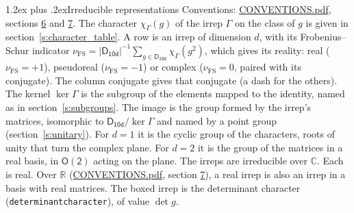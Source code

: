 \documentclass[10pt,a4paper]{article}
\makeatletter
\renewcommand\section{\@startsection{section}{1}{\z@}{-3ex plus -1ex minus -.2ex}%
  {1.2ex plus .2ex}{\normalfont\large\sffamily\bfseries\color{parttitle}}}
\numberwithin{equation}{section}
\newcommand{\grp}[1]{\mathsf{#1}}
\newcommand{\irchar}[1]{\chi_{#1}}
\newcommand{\fsind}{\nu_{\mathrm{FS}}}
\makeatother
\begin{document}
\section{Irreducible representations}\label{s:irreps}
Conventions: \href{../../CONVENTIONS.pdf}{CONVENTIONS.pdf}, sections \href{../../CONVENTIONS.pdf\#conv.6}{6} and \href{../../CONVENTIONS.pdf\#conv.7}{7}.
\leavevmode\label{n:function.character}\label{n:irrep.Gamma}The character $\irchar{\Gamma}(g)$ of the irrep $\Gamma$ on the class of $g$ is given in section~\ref{s:character_table}.
\leavevmode\label{n:index.dimension}\label{n:index.frobenius}\label{n:head.irrep}\label{n:head.reality}A row is an irrep of dimension $d$, with its Frobenius--Schur indicator $\fsind = |\grp{D_{10d}}|^{-1}\allowbreak\sum_{g\in\grp{D_{10d}}}\irchar{\Gamma}(g^2)$, which gives its reality: real ($\fsind = +1$), pseudoreal ($\fsind = -1$) or complex ($\fsind = 0$, paired with its conjugate). \label{n:head.conjugate}The column conjugate gives that conjugate (a dash for the others). \label{n:head.kernel}The kernel $\ker\Gamma$ is the subgroup of the elements mapped to the identity, named as in section~\ref{s:subgroups}. \label{n:head.image}The image is the group formed by the irrep's matrices, isomorphic to $\grp{D_{10d}}/\ker\Gamma$ and named by a point group (section~\ref{s:unitary}). For $d = 1$ it is the cyclic group of the characters, roots of unity that turn the complex plane. For $d = 2$ it is the group of the matrices in a real basis, in $\grp{O(2)}$ acting on the plane. The irreps are irreducible over $\mathbb{C}$. Each is real. Over $\mathbb{R}$ (\href{../../CONVENTIONS.pdf}{CONVENTIONS.pdf}, section \href{../../CONVENTIONS.pdf\#conv.7}{7}), a real irrep is also an irrep in a basis with real matrices. \label{n:mark.determinant}The boxed irrep is the determinant character (\texttt{determinantcharacter}), of value $\det g$.
\setlength{\emergencystretch}{2em}\par\setlength{\emergencystretch}{0pt}
\end{document}
